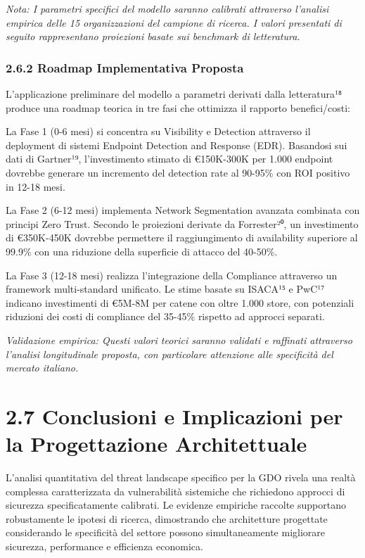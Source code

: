 \documentclass[12pt,a4paper,oneside]{book}
\begin{document}
\emph{Nota: I parametri specifici del modello saranno calibrati
attraverso l'analisi empirica delle 15 organizzazioni del campione di
ricerca. I valori presentati di seguito rappresentano proiezioni basate
sui benchmark di letteratura.}

\subsubsection{2.6.2 Roadmap Implementativa
Proposta}\label{roadmap-implementativa-proposta}

L'applicazione preliminare del modello a parametri derivati dalla
letteratura¹⁸ produce una roadmap teorica in tre fasi che ottimizza il
rapporto benefici/costi:

La Fase 1 (0-6 mesi) si concentra su Visibility e Detection attraverso
il deployment di sistemi Endpoint Detection and Response (EDR).
Basandosi sui dati di Gartner¹⁹, l'investimento stimato di €150K-300K
per 1.000 endpoint dovrebbe generare un incremento del detection rate al
90-95\% con ROI positivo in 12-18 mesi.

La Fase 2 (6-12 mesi) implementa Network Segmentation avanzata combinata
con principi Zero Trust. Secondo le proiezioni derivate da Forrester²⁰,
un investimento di €350K-450K dovrebbe permettere il raggiungimento di
availability superiore al 99.9\% con una riduzione della superficie di
attacco del 40-50\%.

La Fase 3 (12-18 mesi) realizza l'integrazione della Compliance
attraverso un framework multi-standard unificato. Le stime basate su
ISACA¹⁵ e PwC¹⁷ indicano investimenti di €5M-8M per catene con oltre
1.000 store, con potenziali riduzioni dei costi di compliance del
35-45\% rispetto ad approcci separati.

\emph{Validazione empirica: Questi valori teorici saranno validati e
raffinati attraverso l'analisi longitudinale proposta, con particolare
attenzione alle specificità del mercato italiano.}

\section{2.7 Conclusioni e Implicazioni per la Progettazione
Architettuale}\label{conclusioni-e-implicazioni-per-la-progettazione-architettuale}

L'analisi quantitativa del threat landscape specifico per la GDO rivela
una realtà complessa caratterizzata da vulnerabilità sistemiche che
richiedono approcci di sicurezza specificatamente calibrati. Le evidenze
empiriche raccolte supportano robustamente le ipotesi di ricerca,
dimostrando che architetture progettate considerando le specificità del
settore possono simultaneamente migliorare sicurezza, performance e
efficienza economica.
\end{document}
